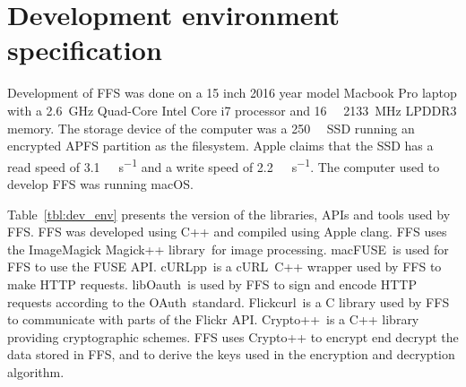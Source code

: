 \section{Development environment specification}
\label{sec:dev_env}
Development of \gls{FFS} was done on a 15 inch 2016 year model Macbook Pro laptop with a \SI{2.6}{\giga\hertz} \mbox{Quad-Core} Intel Core i7 processor and \SI{16}{\giga\byte} \SI{2133}{\mega\hertz} LPDDR3 memory. The storage device of the computer was a \SI{250}{\giga\byte} \gls{SSD} running an encrypted \gls{APFS} partition as the filesystem. Apple claims that the \gls{SSD} has a read speed of \SI[per-mode = symbol]{3.1}{\giga\byte\per\second} and a write speed of \SI[per-mode = symbol]{2.2}{\giga\byte\per\second}. The computer used to develop FFS was running macOS.

Table~\ref{tbl:dev_env} presents the version of the libraries, \gls{API}s and tools used by FFS. FFS was developed using C++ and compiled using Apple clang. \gls{FFS} uses the ImageMagick Magick++ library\,\cite{ImageMagick2022} for image processing. macFUSE\,\cite{HomeMacFUSE} is used for \gls{FFS} to use the \gls{FUSE} \gls{API}. cURLpp\,\cite{barrette-lapierreCURLpp2022} is a cURL\,\cite{CurlCurl2022} C++ wrapper used by \gls{FFS} to make HTTP requests. libOauth\,\cite{Liboauth} is used by \gls{FFS} to sign and encode HTTP requests according to the OAuth\,\cite{barrette-lapierreCURLpp2022} standard. Flickcurl\,\cite{beckettFlickcurlLibraryFlickr} is a C library used by \gls{FFS} to communicate with parts of the Flickr \gls{API}. Crypto++\,\cite{CryptoLibraryFree} is a C++ library providing cryptographic schemes. \gls{FFS} uses Crypto++ to encrypt end decrypt the data stored in \gls{FFS}, and to derive the keys used in the encryption and decryption algorithm. 


